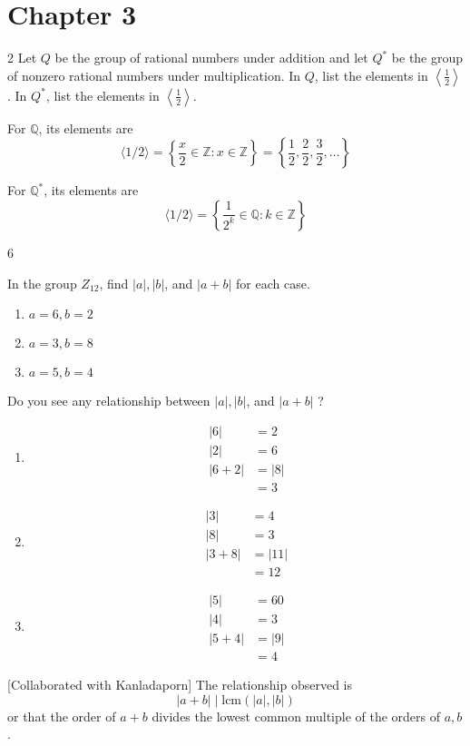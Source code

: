 \section*{Chapter 3}

\begin{hwproblem}
{2}{
    Let $Q$ be the group of rational numbers under addition and let $Q^*$ be the group of nonzero rational numbers under multiplication. In $Q$, list the elements in $\left\langle\frac{1}{2}\right\rangle$. In $Q^*$, list the elements in $\left\langle\frac{1}{2}\right\rangle$.
}

For \(\mathbb{Q}\), its elements are
\[
    \langle 1/2 \rangle = \left\{\frac{x}{2} \in \mathbb{Z} : x \in \mathbb{Z}\right\} = \left\{\frac{1}{2}, \frac{2}{2}, \frac{3}{2}, \ldots\right\}
\]

For \(\mathbb{Q}^*\), its elements are
\[
    \langle 1/2 \rangle = \left\{\frac{1}{2^k} \in \mathbb{Q} : k \in \mathbb{Z}\right\}
\]
\end{hwproblem}

\begin{hwproblem}
{6}{
    In the group $Z_{12}$, find $|a|,|b|$, and $|a+b|$ for each case.
    \begin{enumerate}[label=\alph*.]
        \item $a=6, b=2$
        \item $a=3, b=8$
        \item $a=5, b=4$
    \end{enumerate}
    Do you see any relationship between $|a|,|b|$, and $|a+b|$ ?
}

\begin{enumerate}[label=\alph*.]
    \item 
        \[
        \begin{aligned}
            |6| &= 2 \\
            |2| &= 6 \\
            |6+2| &= |8| \\
                  &= 3
        \end{aligned}
        \]
    \item 
        \[
        \begin{aligned}
            |3| &= 4 \\
            |8| &= 3 \\
            |3+8| &= |11| \\
                  &= 12
        \end{aligned}
        \]
    \item
        \[
        \begin{aligned}
            |5| &= 60 \\
            |4| &= 3 \\
            |5+4| &= |9| \\
                  &= 4
        \end{aligned}
        \]
\end{enumerate}

[Collaborated with Kanladaporn] The relationship observed is
\[
    |a+b| \mid \text{lcm}(|a|, |b|)
\]
or that the order of \(a+b\) divides the lowest common multiple of the orders of \(a, b\).
\end{hwproblem}

